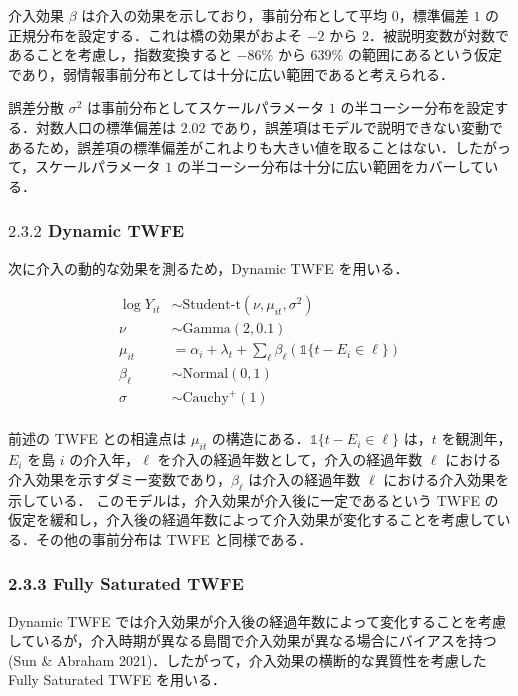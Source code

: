 介入効果 \(\beta\) は介入の効果を示しており，事前分布として平均
\(0\)，標準偏差 \(1\) の正規分布を設定する．これは橋の効果がおよそ
\(-2\) から \(2\)．被説明変数が対数であることを考慮し，指数変換すると
\(-86\%\) から \(639\%\)
の範囲にあるという仮定であり，弱情報事前分布としては十分に広い範囲であると考えられる．

誤差分散 \(\sigma^2\) は事前分布としてスケールパラメータ \(1\)
の半コーシー分布を設定する．対数人口の標準偏差は \(2.02\)
であり，誤差項はモデルで説明できない変動であるため，誤差項の標準偏差がこれよりも大きい値を取ることはない．したがって，スケールパラメータ
\(1\) の半コーシー分布は十分に広い範囲をカバーしている．

\hypertarget{dynamic-twfe}{%
\subsubsection{\texorpdfstring{\(2.3.2\) Dynamic
TWFE}{2.3.2 Dynamic TWFE}}\label{dynamic-twfe}}

次に介入の動的な効果を測るため，Dynamic TWFE を用いる．

\[
\begin{aligned}
\log{Y_{it}} &\sim \text{Student-t} (\nu, \mu_{it}, \sigma^2) \\
\nu &\sim \text{Gamma}(2, 0.1) \\
\mu_{it} &= \alpha_i + \lambda_t + \sum_{\ell} \beta_{\ell} (\mathbb{1}\{t - E_i \in \ell\}) \\
\beta_{\ell} &\sim \text{Normal}(0, 1) \\
\sigma &\sim \text{Cauchy}^+(1) \\
\end{aligned}
\]

前述の TWFE との相違点は \(\mu_{it}\)
の構造にある．\(\mathbb{1}\{t - E_i \in \ell\}\) は，\(t\)
を観測年，\(E_i\) を島 \(i\) の介入年，\(\ell\)
を介入の経過年数として，介入の経過年数 \(\ell\)
における介入効果を示すダミー変数であり，\(\beta_{\ell}\)
は介入の経過年数 \(\ell\) における介入効果を示している．
このモデルは，介入効果が介入後に一定であるという TWFE
の仮定を緩和し，介入後の経過年数によって介入効果が変化することを考慮している．その他の事前分布は
TWFE と同様である．

\hypertarget{fully-saturated-twfe}{%
\subsubsection{2.3.3 Fully Saturated TWFE}\label{fully-saturated-twfe}}

Dynamic TWFE
では介入効果が介入後の経過年数によって変化することを考慮しているが，介入時期が異なる島間で介入効果が異なる場合にバイアスを持つ
(Sun \& Abraham 2021)．したがって，介入効果の横断的な異質性を考慮した
Fully Saturated TWFE を用いる．

